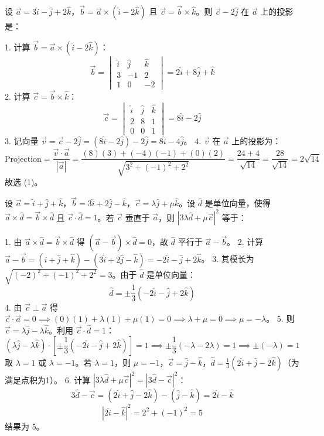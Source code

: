 \begin{questions}
\question
设 $\vec{a} = 3\hat{i} - \hat{j} + 2\hat{k}$，$\vec{b} = \vec{a} \times (\hat{i} - 2\hat{k})$ 且 $\vec{c} = \vec{b} \times \hat{k}$。则 $\vec{c} - 2\hat{j}$ 在 $\vec{a}$ 上的投影是：

\begin{solution}
1. 计算 $\vec{b} = \vec{a} \times (\hat{i} - 2\hat{k})$：
\[
\vec{b} = \begin{vmatrix} \hat{i} & \hat{j} & \hat{k} \\ 3 & -1 & 2 \\ 1 & 0 & -2 \end{vmatrix} = 2\hat{i} + 8\hat{j} + \hat{k}
\]
2. 计算 $\vec{c} = \vec{b} \times \hat{k}$：
\[
\vec{c} = \begin{vmatrix} \hat{i} & \hat{j} & \hat{k} \\ 2 & 8 & 1 \\ 0 & 0 & 1 \end{vmatrix} = 8\hat{i} - 2\hat{j}
\]
3. 记向量 $\vec{v} = \vec{c} - 2\hat{j} = (8\hat{i} - 2\hat{j}) - 2\hat{j} = 8\hat{i} - 4\hat{j}$。
4. $\vec{v}$ 在 $\vec{a}$ 上的投影为：
\[
\text{Projection} = \frac{\vec{v} \cdot \vec{a}}{|\vec{a}|} = \frac{(8)(3) + (-4)(-1) + (0)(2)}{\sqrt{3^2 + (-1)^2 + 2^2}} = \frac{24 + 4}{\sqrt{14}} = \frac{28}{\sqrt{14}} = 2\sqrt{14}
\]
故选 (1)。
\end{solution}

\question
设 $\vec{a} = \hat{i} + \hat{j} + \hat{k}$，$\vec{b} = 3\hat{i} + 2\hat{j} - \hat{k}$，$\vec{c} = \lambda\hat{j} + \mu\hat{k}$。设 $\hat{d}$ 是单位向量，使得 $\vec{a} \times \hat{d} = \vec{b} \times \hat{d}$ 且 $\vec{c} \cdot \hat{d} = 1$。若 $\vec{c}$ 垂直于 $\vec{a}$，则 $|3\lambda\hat{d} + \mu\vec{c}|^2$ 等于：

\begin{solution}
1. 由 $\vec{a} \times \hat{d} = \vec{b} \times \hat{d}$ 得 $(\vec{a} - \vec{b}) \times \hat{d} = 0$，故 $\hat{d}$ 平行于 $\vec{a} - \vec{b}$。
2. 计算 $\vec{a} - \vec{b} = (\hat{i} + \hat{j} + \hat{k}) - (3\hat{i} + 2\hat{j} - \hat{k}) = -2\hat{i} - \hat{j} + 2\hat{k}$。
3. 其模长为 $\sqrt{(-2)^2 + (-1)^2 + 2^2} = 3$。由于 $\hat{d}$ 是单位向量：
\[
\hat{d} = \pm \frac{1}{3} (-2\hat{i} - \hat{j} + 2\hat{k})
\]
4. 由 $\vec{c} \perp \vec{a}$ 得 $\vec{c} \cdot \vec{a} = 0 \implies (0)(1) + \lambda(1) + \mu(1) = 0 \implies \lambda + \mu = 0 \implies \mu = -\lambda$。
5. 则 $\vec{c} = \lambda\hat{j} - \lambda\hat{k}$。利用 $\vec{c} \cdot \hat{d} = 1$：
\[
(\lambda\hat{j} - \lambda\hat{k}) \cdot \left[ \pm \frac{1}{3} (-2\hat{i} - \hat{j} + 2\hat{k}) \right] = 1 \implies \pm \frac{1}{3} (-\lambda - 2\lambda) = 1 \implies \pm (-\lambda) = 1
\]
取 $\lambda = 1$ 或 $\lambda = -1$。若 $\lambda = 1$，则 $\mu = -1$，$\vec{c} = \hat{j} - \hat{k}$，$\hat{d} = \frac{1}{3} (2\hat{i} + \hat{j} - 2\hat{k})$（为满足点积为1）。
6. 计算 $|3\lambda\hat{d} + \mu\vec{c}|^2 = |3\hat{d} - \vec{c}|^2$：
\[
3\hat{d} - \vec{c} = (2\hat{i} + \hat{j} - 2\hat{k}) - (\hat{j} - \hat{k}) = 2\hat{i} - \hat{k}
\]
\[
|2\hat{i} - \hat{k}|^2 = 2^2 + (-1)^2 = 5
\]
结果为 5。
\end{solution}


\end{questions}
